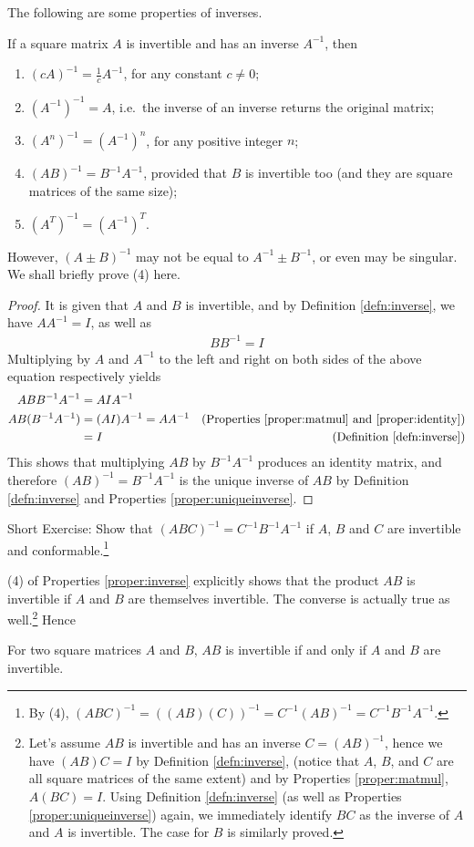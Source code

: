 The following are some properties of inverses.
\begin{proper}
\label{proper:inverse}
If a square matrix $A$ is invertible and has an inverse $A^{-1}$, then
\begin{enumerate}
\item $(cA)^{-1} = \frac{1}{c}A^{-1}$, for any constant $c \neq 0$;
\item $(A^{-1})^{-1} = A$, i.e.\ the inverse of an inverse returns the original matrix;
\item $(A^n)^{-1} = (A^{-1})^n$, for any positive integer $n$;
\item $(AB)^{-1} = B^{-1}A^{-1}$, provided that $B$ is invertible too (and they are square matrices of the same size);
\item $(A^T)^{-1} = (A^{-1})^T$.
\end{enumerate}
\end{proper}
However, $(A\pm B)^{-1}$ may not be equal to $A^{-1} \pm B^{-1}$, or even may be singular. We shall briefly prove (4) here.
\begin{proof}
It is given that $A$ and $B$ is invertible, and by Definition \ref{defn:inverse}, we have $AA^{-1} = I$, as well as 
\begin{align*}
BB^{-1} = I    
\end{align*}
Multiplying by $A$ and $A^{-1}$ to the left and right on both sides of the above equation respectively yields
\begin{align*}
ABB^{-1}A^{-1} &= AIA^{-1} \\
AB(B^{-1}A^{-1}) &= (AI)A^{-1} = AA^{-1} & \text{(Properties \ref{proper:matmul} and \ref{proper:identity})} \\
&= I & \text{(Definition \ref{defn:inverse})}
\end{align*}
This shows that multiplying $AB$ by $B^{-1}A^{-1}$ produces an identity matrix, and therefore $(AB)^{-1} = B^{-1}A^{-1}$ is the unique inverse of $AB$ by Definition \ref{defn:inverse} and Properties \ref{proper:uniqueinverse}.
\end{proof}
Short Exercise: Show that $(ABC)^{-1} = C^{-1}B^{-1}A^{-1}$ if $A$, $B$ and $C$ are invertible and conformable.\footnote{By (4), $(ABC)^{-1} = ((AB)(C))^{-1} = C^{-1}(AB)^{-1} = C^{-1}B^{-1}A^{-1}$.}\par
(4) of Properties \ref{proper:inverse} explicitly shows that the product $AB$ is invertible if $A$ and $B$ are themselves invertible. The converse is actually true as well.\footnote{Let's assume $AB$ is invertible and has an inverse $C = (AB)^{-1}$, hence we have $(AB)C = I$ by Definition \ref{defn:inverse}, (notice that $A$, $B$, and $C$ are all square matrices of the same extent) and by Properties \ref{proper:matmul}, $A(BC) = I$. Using Definition \ref{defn:inverse} (as well as Properties \ref{proper:uniqueinverse}) again, we immediately identify $BC$ as the inverse of $A$ and $A$ is invertible. The case for $B$ is similarly proved.} Hence
\begin{proper}
\label{proper:ABinv}
For two square matrices $A$ and $B$, $AB$ is invertible if and only if $A$ and $B$ are invertible.
\end{proper}

